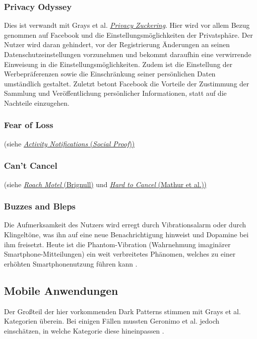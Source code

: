 \documentclass[a4paper]{article}
\begin{document}
\subsubsection{Privacy Odyssey}
Dies ist verwandt mit Grays et al. \hyperref[para:privacy_zuckering]{\textit{Privacy Zuckering}}. Hier wird vor allem Bezug genommen auf Facebook und die Einstellungsmöglichkeiten der Privatsphäre. Der Nutzer wird daran gehindert, vor der Registrierung Änderungen an seinen Datenschutzeinstellungen vorzunehmen und bekommt daraufhin eine verwirrende Einweisung in die Einstellungsmöglichkeiten. Zudem ist die Einstellung der Werbepräferenzen sowie die Einschränkung seiner persönlichen Daten umständlich gestaltet. Zuletzt betont Facebook die Vorteile der Zustimmung der Sammlung und Veröffentlichung persönlicher Informationen, statt auf die Nachteile einzugehen.

\subsubsection{Fear of Loss}
(siehe \hyperref[para:activity_notifications]{\textit{Activity Notifications} (\textit{Social Proof}))}

\subsubsection{Can't Cancel}
(siehe \hyperref[para:roach_motel]{\textit{Roach Motel} (Brignull)} und \hyperref[para:hard_to_cancel]{\textit{Hard to Cancel} (Mathur et al.))}

\subsubsection{Buzzes and Bleps}
Die Aufmerksamkeit des Nutzers wird erregt durch Vibrationsalarm oder durch Klingeltöne, was ihn auf eine neue Benachrichtigung hinweist und Dopamine bei ihm freisetzt. Heute ist die Phantom-Vibration (Wahrnehmung imaginärer Smartphone-Mitteilungen) ein weit verbreitetes Phänomen, welches zu einer erhöhten Smartphonenutzung führen kann \cite{pareek}. 

\subsection{Mobile Anwendungen}
\label{sub:mobile_anwendungen}
Der Großteil der hier vorkommenden Dark Patterns stimmen mit Grays et al. Kategorien überein. Bei einigen Fällen mussten Geronimo et al. jedoch einschätzen, in welche Kategorie diese hineinpassen \cite{geronimo}.
\end{document}
